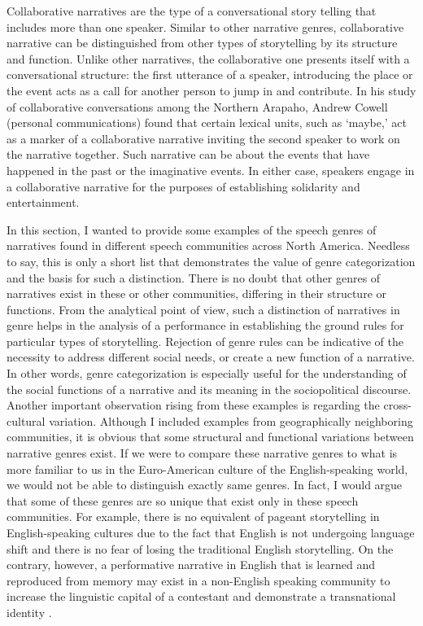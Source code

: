 \documentclass[12pt, draft]{article}
\begin{document}
Collaborative narratives are the type of a conversational story telling that includes more than one speaker. Similar to other narrative genres, collaborative narrative can be distinguished from other types of storytelling by its structure and function. Unlike other narratives, the collaborative one presents itself with a conversational structure: the first utterance of a speaker, introducing the place or the event acts as a call for another person to jump in and contribute. In his study of collaborative conversations among the Northern Arapaho, Andrew Cowell (personal communications) found that certain lexical units, such as `maybe,' act as a marker of a collaborative narrative inviting the second speaker to work on the narrative together. Such narrative can be about the events that have happened in the past or the imaginative events. In either case, speakers engage in a collaborative narrative for the purposes of establishing solidarity and entertainment. 

In this section, I wanted to provide some examples of the speech genres of narratives found in different speech communities across North America. Needless to say, this is only a short list that demonstrates the value of genre categorization and the basis for such a distinction. There is no doubt that other genres of narratives exist in these or other communities, differing in their structure or functions. From the analytical point of view, such a distinction of narratives in genre helps in the analysis of a performance in establishing the ground rules for particular types of storytelling. Rejection of genre rules can be indicative of the necessity to address different social needs, or create a new function of a narrative. In other words, genre categorization is especially useful for the understanding of the social functions of a narrative and its meaning in the sociopolitical discourse. Another important observation rising from these examples is regarding the cross-cultural variation. Although I included examples from geographically neighboring communities, it is obvious that some structural and functional variations between narrative genres exist. If we were to compare these narrative genres to what is more familiar to us in the Euro-American culture of the English-speaking world, we would not be able to distinguish exactly same genres. In fact, I would argue that some of these genres are so unique that exist only in these speech communities. For example, there is no equivalent of pageant storytelling in English-speaking cultures due to the fact that English is not undergoing language shift and there is no fear of losing the traditional English storytelling. On the contrary, however, a performative narrative in English that is learned and reproduced from memory may exist in a non-English speaking community to increase the linguistic capital of a contestant and demonstrate a transnational identity \parencite{billings2009}. 
\end{document}
